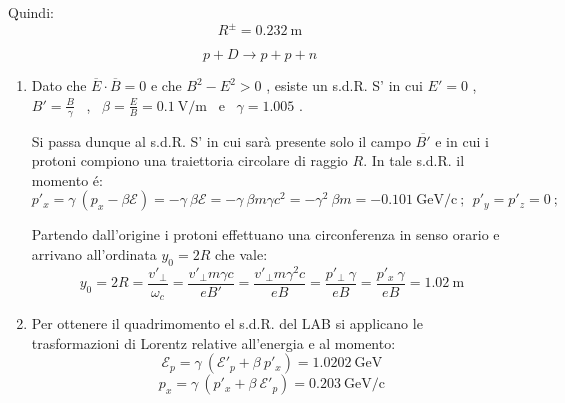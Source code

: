 \documentclass[12pt,twoside,a4]{article}
\begin{document}
\begin{solution}
\begin{enumerate}[label=(\textit{\roman*})]
Quindi: \begin{equation*}
R^{\pm} = 0.232 \ \mathrm{m}    
\end{equation*}
\end{enumerate}
\end{solution}





\begin{solution}
\begin{equation}\label{eq: dec5.3}
    p + D \rightarrow p + p + n 
\end{equation}
\begin{enumerate}[label=(\textit{\roman*})]
	\item Dato che $\overline{E} \cdot \overline{B} = 0$ e che $B^2 - E^2 > 0$ , esiste un s.d.R. S' in cui $E' = 0 $ ,  $B' = \frac{B}{\gamma}$ \ ,  \ $\beta = \frac{E}{B} = 0.1 \ \mathrm{V/m}$ \ e \ $\gamma = 1.005$ .

Si passa dunque al s.d.R. S' in cui sarà presente solo il campo $\overline{B'}$ e in cui i protoni compiono una traiettoria circolare di raggio $R$. In tale s.d.R. il momento é: \begin{equation*}
   p'_x = \gamma \ (p_x - \beta \mathcal{E}) = -\gamma \ \beta \mathcal{E} = - \gamma \ \beta m \gamma c^2 = - \gamma^2 \ \beta m = -0.101 \ \mathrm{GeV/c} \ ; \ \ p'_y = p'_z = 0  \ ;   
\end{equation*}

Partendo dall'origine i protoni effettuano una circonferenza in senso orario e arrivano all'ordinata $y_0 = 2R$ che vale: 
\begin{equation*}
    y_0 = 2R = \frac{v'_\bot}{\omega_c} = \frac{v'_\bot m \gamma c}{eB'} = \frac{v'_\bot m \gamma^2 c}{eB} = \frac{p'_\bot \ \gamma}{eB} = \frac{p'_x \ \gamma}{eB} = 1.02 \ \mathrm{m} 
\end{equation*}
\item Per ottenere il quadrimomento el s.d.R. del LAB si applicano le trasformazioni di Lorentz relative all'energia e al momento: 
\begin{equation*}
    \mathcal{E}_p = \gamma \ (\mathcal{E}'_p + \beta \ p'_x) = 1.0202 \ \mathrm{GeV} 
\end{equation*}
\vspace{-4mm}
\begin{equation*}
    p_x = \gamma \ (p'_x + \beta \  \mathcal{E}'_p) = 0.203 \ \mathrm{GeV/c} 
\end{equation*}


\end{enumerate}
\end{solution}
\end{document}
